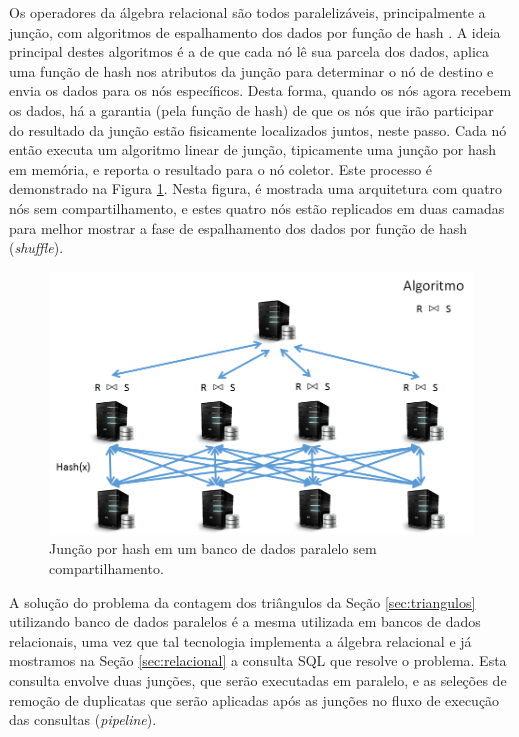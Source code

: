 Os operadores da álgebra relacional são todos paralelizáveis, principalmente
a junção, com algoritmos de espalhamento dos dados por função de hash 
\cite{Schneider1989}. A ideia principal destes algoritmos é a de que cada 
nó lê sua parcela dos dados, aplica uma função de hash nos atributos da
junção para determinar o nó de destino e envia os dados para os nós específicos.
Desta forma, quando os nós agora recebem os dados, há a garantia (pela
função de hash) de que os nós que irão participar do resultado da junção 
estão fisicamente localizados juntos, neste passo. Cada nó então executa um
algoritmo linear de junção, tipicamente uma junção por hash em memória,
e reporta o resultado para o nó coletor. Este processo é demonstrado na 
Figura \ref{fig:mpp_hashjoin}. Nesta figura, é mostrada uma arquitetura
com quatro nós sem compartilhamento, e estes quatro nós estão replicados 
em duas camadas para melhor mostrar a fase de espalhamento dos dados
por função de hash (\emph{shuffle}).

\begin{figure}
        \centering
        \includegraphics[width=\linewidth]{./mpp_hashjoin.png}
        \caption{Junção por hash em um banco de dados paralelo sem compartilhamento.}
        \label{fig:mpp_hashjoin}
\end{figure}

A solução do problema da contagem dos triângulos da Seção \ref{sec:triangulos} utilizando
banco de dados paralelos é a mesma utilizada em bancos de dados relacionais, uma vez que tal tecnologia 
implementa a álgebra relacional e já mostramos na Seção \ref{sec:relacional}
a consulta SQL que resolve o problema. Esta consulta envolve duas junções, 
que serão executadas em paralelo, e as seleções de remoção de duplicatas que
serão aplicadas após as junções no fluxo de execução das consultas (\emph{pipeline}).


